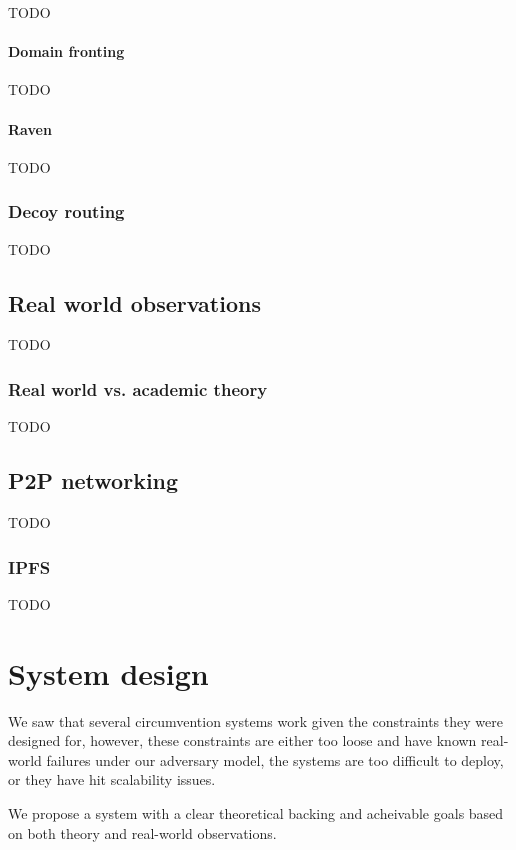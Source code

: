 \documentclass[12pt]{report}
\begin{document}
TODO

\subsubsection{Domain fronting}

TODO

\subsubsection{Raven}

TODO

\subsection{Decoy routing}

TODO

\section{Real world observations}

TODO

\subsection{Real world vs. academic theory}

TODO

\section{P2P networking}

TODO

\subsection{IPFS}

TODO

\chapter{System design}

We saw that several circumvention systems work given the constraints they were designed for, however, these constraints are either too loose and have known real-world failures under our adversary model, the systems are too difficult to deploy, or they have hit scalability issues.

We propose a system with a clear theoretical backing and acheivable goals based on both theory and real-world observations.
\end{document}
